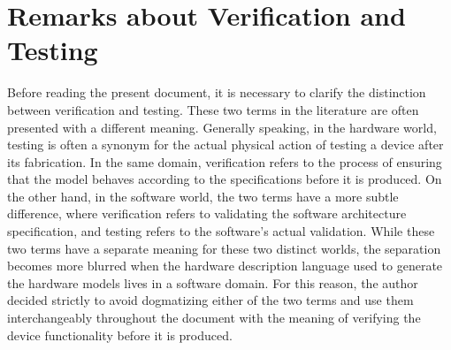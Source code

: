 \section{Remarks about Verification and Testing}
Before reading the present document, it is necessary to clarify the distinction
between verification and testing. These two terms in the literature are often
presented with a different meaning. Generally speaking, in the hardware world,
testing is often a synonym for the actual physical action of testing a device
after its fabrication. In the same domain, verification refers to the process of
ensuring that the model behaves according to the specifications before it is
produced. On the other hand, in the software world, the two terms have a more
subtle difference, where verification refers to validating the software
architecture specification, and testing refers to the software's actual
validation. While these two terms have a separate meaning for these two distinct
worlds, the separation becomes more blurred when the hardware description
language used to generate the hardware models lives in a software domain. For
this reason, the author decided strictly to avoid dogmatizing either of the two
terms and use them interchangeably throughout the document with the meaning of
verifying the device functionality before it is produced.
